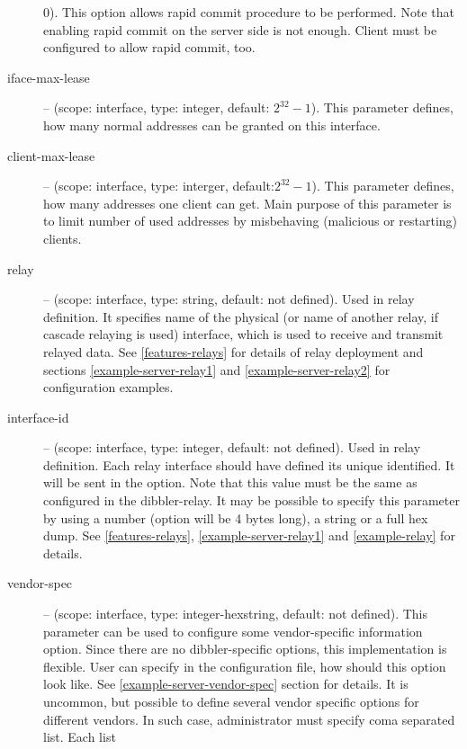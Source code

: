 \begin{description}
            0). This option allows rapid commit procedure to be
            performed. Note that enabling rapid commit on the server
            side is not enough. Client must be configured to allow
	    rapid commit, too.
\item[iface-max-lease] -- (scope: interface, type: integer, default:
            $2^{32}-1$). This parameter defines, how many normal
            addresses can be granted on this interface.
\item[client-max-lease] -- (scope: interface, type: interger,
            default:$2^{32}-1$). This parameter defines, how many
            addresses one client can get. Main purpose of this
            parameter is to limit number of used addresses by
            misbehaving (malicious or restarting) clients.
\item[relay] -- (scope: interface, type: string, default: not
            defined). Used in relay definition.
            It specifies name of the physical (or name of
            another relay, if cascade relaying is used) interface,
            which is used to receive and transmit relayed data. See
            \ref{features-relays} for details of relay deployment and
            sections \ref{example-server-relay1} and
            \ref{example-server-relay2} for configuration examples. 
\item[interface-id] -- (scope: interface, type: integer, default: not
            defined). Used in relay definition. Each relay interface
            should have defined its unique identified. It will be sent
            in the  option. Note that this value
            must be the same as configured in the dibbler-relay. It
            may be possible to specify this parameter by using a
            number (option will be 4 bytes long), a string or a full
            hex dump.  See
            \ref{features-relays}, \ref{example-server-relay1} and
            \ref{example-relay} for details.
 \item[vendor-spec] -- (scope: interface, type: integer-hexstring,
	    default: not defined). This parameter can be used to
	    configure some vendor-specific information option. Since
	    there are no dibbler-specific options, this implementation
	    is flexible. User can specify in the configuration file,
	    how should this option look like. See
	    \ref{example-server-vendor-spec} section for details. It
            is uncommon, but possible to define several vendor
            specific options for different vendors. In such case,
            administrator must specify coma separated list. Each list

\end{description}
